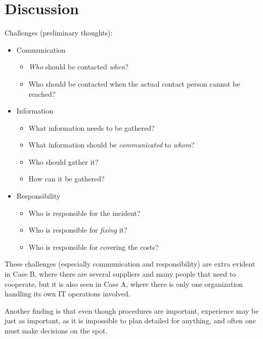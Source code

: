 \chapter{Discussion}

Challenges (preliminary thoughts):
\begin{itemize}
\item Communication
\begin{itemize}
\item \textit{Who} should be contacted \textit{when}?
\item Who should be contacted when the actual contact person cannot be reached?
\end{itemize}
\item Information
\begin{itemize}
\item What information needs to be gathered?
\item What information should be \textit{communicated} to \textit{whom}?
\item Who should gather it?
\item How can it be gathered?
\end{itemize}
\item Responsibility
\begin{itemize}
\item Who is responsible for the incident?
\item Who is responsible for \textit{fixing} it?
\item Who is responsible for covering the costs?
\end{itemize}
\end{itemize}

These challenges (especially communication and responsibility) are extra evident in Case B, where there are several suppliers and many people that need to cooperate, but it is also seen in Case A, where there is only one organization handling its own IT operations involved.

Another finding is that even though procedures are important, experience may be just as important, as it is impossible to plan detailed for anything, and often one must make decisions on the spot.